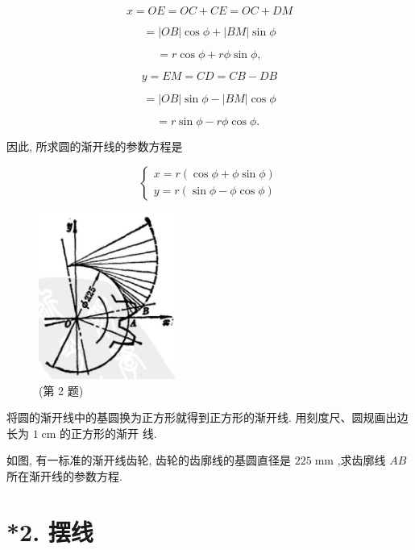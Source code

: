 \documentclass[lang=cn,newtx,12pt,scheme=chinese]{elegantbook}
\begin{document}
\[
  x = {OE} = {OC} + {CE} = {OC} + {DM}
\]

\[
  = \left| {OB}\right| \cos \phi + \left| {BM}\right| \sin \phi
\]

\[
  = r\cos \phi + {r\phi }\sin \phi ,
\]

\[
  y = {EM} = {CD} = {CB} - {DB}
\]

\[
  = \left| {OB}\right| \sin \phi - \left| {BM}\right| \cos \phi
\]

\[
  = r\sin \phi - {r\phi }\cos \phi \text{. }
\]

因此, 所求圆的渐开线的参数方程是

\[
  \left\{ \begin{array}{l} x = r\left( {\cos \phi + \phi \sin \phi }\right) \\ y = r\left( {\sin \phi - \phi \cos \phi }\right) \end{array}\right.
\]

\begin{problemset}[练习]

\item \begin{figure}[h]
  \centering
  \includegraphics[max width=0.4\textwidth]{images/01912cc2-ffb6-728e-9ae7-b113ff05c64b_168_702682.jpg}
  \caption{(第 2 题)}
\end{figure}

\item 将圆的渐开线中的基圆换为正方形就得到正方形的渐开线. 用刻度尺、圆规画出边长为 \(1\mathrm{\;{cm}}\) 的正方形的渐开 线.

\item 如图, 有一标准的渐开线齿轮, 齿轮的齿廓线的基圆直径是 \({225}\mathrm{\;{mm}}\) ,求齿廓线 \({AB}\) 所在渐开线的参数方程.

\end{problemset}

\section*{*2. 摆线}
\end{document}
